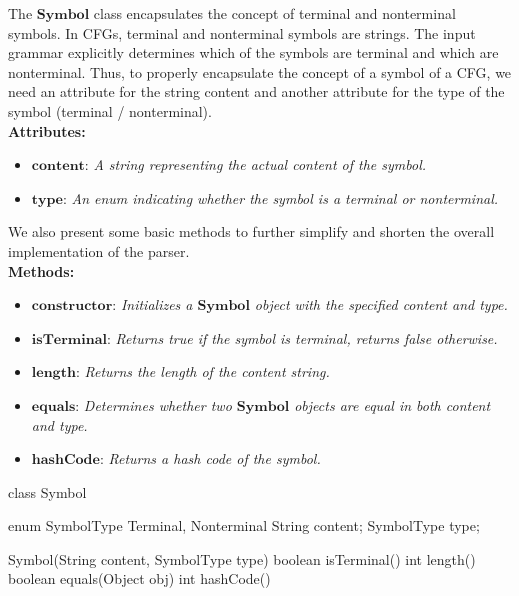 The \(\boldsymbol{Symbol}\) class encapsulates the concept of terminal and nonterminal symbols. In CFGs, terminal and nonterminal symbols are strings. The input grammar explicitly determines which of the symbols are terminal and which are nonterminal. Thus, to properly encapsulate the concept of a symbol of a CFG, we need an attribute for the string content and another attribute for the type of the symbol (terminal / nonterminal).\\

\textbf{Attributes:}
\begin{itemize}
    \item \(\boldsymbol{content}\): \textit{A string representing the actual content of the symbol.}
    \item \(\boldsymbol{type}\): \textit{An enum indicating whether the symbol is a terminal or nonterminal.}
\end{itemize}

We also present some basic methods to further simplify and shorten the overall implementation of the parser.\\

\textbf{Methods:}
\begin{itemize}
    \item \(\boldsymbol{constructor}\): \textit{Initializes a \(\boldsymbol{Symbol}\) object with the specified content and type.}
    \item \(\boldsymbol{isTerminal}\): \textit{Returns true if the symbol is terminal, returns false otherwise.}
    \item \(\boldsymbol{length}\): \textit{Returns the length of the content string.}
    \item \(\boldsymbol{equals}\): \textit{Determines whether two \(\boldsymbol{Symbol}\) objects are equal in both content and type.}
    \item \(\boldsymbol{hashCode}\): \textit{Returns a hash code of the symbol.}
\end{itemize}

\begin{codeblock}
    class Symbol {
        enum SymbolType {
            Terminal, Nonterminal
        }
        String content;
        SymbolType type;

        Symbol(String content, SymbolType type) {}
        boolean isTerminal() {}
        int length() {}
        boolean equals(Object obj) {}
        int hashCode() {}
    }
\end{codeblock}


